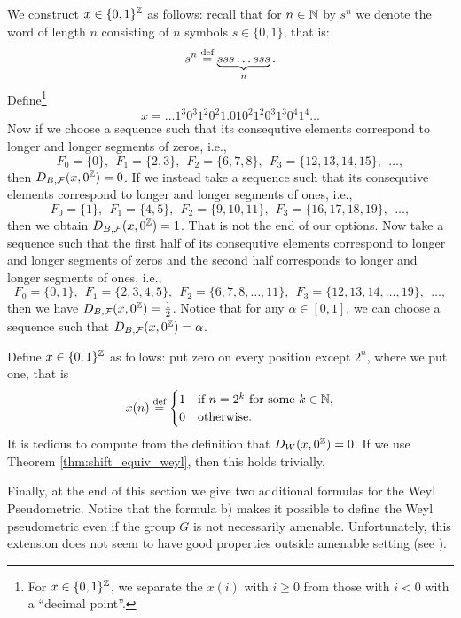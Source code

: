 \noindent 
\begin{example}
We construct $x\in\{0,1\}^{\mathbb{Z}}$ as follows: recall that for $n\in\mathbb{N}$ by $s^n$ we denote the word of length $n$ consisting of $n$ symbols $s\in\{0,1\}$, that is:
\[
s^n\stackrel{\textup{def}}{=} \underbrace{sss\ldots sss}_{n}.
\]
Define\footnote{For $x\in\{0,1\}^{\mathbb{Z}}$,  we separate the $x(i)$ with $i\geq 0$ from those with $i<0$ with a ``decimal point''.}
\[
x=\ldots 1^3 0^3 1^2 0^2 1.010^2 1^2 0^3 1^3 0^4 1^4\ldots 
\]
Now if we choose a \Folner sequence such that its consequtive elements correspond to longer and longer segments of zeros, i.e.,
\[
F_0=\{0\},~~ F_1=\{2,3\},~~ F_2 =\{6,7,8\},~~ F_3=\{12,13,14,15\},~~ \ldots,
\]
then $D_{B,\operatorname{\mathcal{F}}}(x,0^{\mathbb{Z}})=0$.  If we instead take a \Folner sequence such that its consequtive elements correspond to longer and longer segments of ones, i.e.,
\[
F_0=\{1\},~~ F_1=\{4,5\},~~ F_2 =\{9,10,11\},~~ F_3=\{16,17,18,19\},~~ \ldots,
\]
then we obtain $D_{B,\operatorname{\mathcal{F}}}(x,0^{\mathbb{Z}})=1$. That is not the end of our options. Now take a \Folner sequence such that the first half of its consequtive elements correspond to longer and longer segments of zeros and the second half corresponds to longer and longer segments of ones, i.e.,
\[
F_0=\{0,1\},~~ F_1=\{2,3,4,5\},~~ F_2 =\{6,7,8,\ldots,11\},~~ F_3=\{12,13,14,\ldots,19\},~~ \ldots,
\]
then we have $D_{B,\operatorname{\mathcal{F}}}(x,0^{\mathbb{Z}})=\frac{1}{2}$. Notice that for any $\alpha\in[0,1]$, we can choose a \Folner sequence such that $D_{B,\operatorname{\mathcal{F}}}(x,0^{\mathbb{Z}})=\alpha$. 
\end{example}

\begin{example} Define $x\in\{0,1\}^{\mathbb{Z}}$ as follows: put zero on every position except $2^n$, where we put one, that is
\[
x(n)\stackrel{\textup{def}}{=} \begin{cases}1 &\text{if }n=2^k \text{ for some } k\in \mathbb{N}, \\ 0 &\text{otherwise.}\end{cases}
\]
It is tedious to compute from the definition that $D_W(x,0^{\mathbb{Z}})=0$. If we use Theorem \ref{thm:shift_equiv_weyl}, then this holds trivially.
\end{example}
 
Finally, at the end of this section we give two additional formulas for the Weyl Pseudometric. Notice that the formula b) makes it possible to define the Weyl pseudometric even if the group $G$ is not necessarily amenable. Unfortunately, this extension does not seem to have good properties outside amenable setting (see \cite{Solecki05}).

